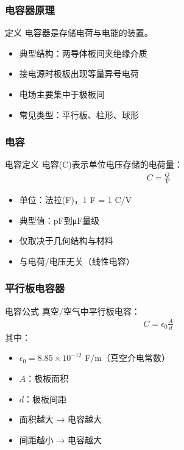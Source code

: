 \documentclass{beamer}
\begin{document}
\begin{frame}
    \frametitle{电容器原理}
    
    \begin{block}{定义}
        电容器是存储电荷与电能的装置。
    \end{block}
    
    \begin{itemize}
        \item 典型结构：两导体板间夹绝缘介质
        \item 接电源时极板出现等量异号电荷
        \item 电场主要集中于极板间
        \item 常见类型：平行板、柱形、球形
    \end{itemize}
\end{frame}

\begin{frame}
    \frametitle{电容}
    
    \begin{block}{电容定义}
        电容(C)表示单位电压存储的电荷量：
        \begin{align}
            C = \frac{Q}{V}
        \end{align}
    \end{block}
    
    \begin{itemize}
        \item 单位：法拉(F)，1 F = 1 C/V
        \item 典型值：pF到μF量级
        \item 仅取决于几何结构与材料
        \item 与电荷/电压无关（线性电容）
    \end{itemize}
\end{frame}

\begin{frame}
    \frametitle{平行板电容器}
    
    \begin{block}{电容公式}
        真空/空气中平行板电容：
        \begin{align}
            C = \epsilon_0 \frac{A}{d}
        \end{align}
        其中：
        \begin{itemize}
            \item $\epsilon_0 = 8.85 \times 10^{-12}$ F/m（真空介电常数）
            \item $A$：极板面积
            \item $d$：极板间距
        \end{itemize}
    \end{block}
    
    \begin{itemize}
        \item 面积越大 → 电容越大
        \item 间距越小 → 电容越大
    \end{itemize}
\end{frame}
\end{document}
